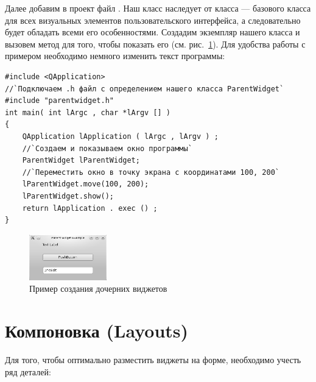 Далее добавим в проект файл . Наш класс наследует от 
класса  --- базового класса для всех
визуальных элементов пользовательского интерфейса, а следовательно будет 
обладать всеми его особенностями. Создадим
экземпляр нашего класса и вызовем метод  для того, чтобы показать 
его (см. рис.~\ref{ch13:refDrawing2}).
Для удобства работы с примером необходимо немного изменить текст программы: 
\begin{lstlisting}	 
#include <QApplication> 
//`Подключаем .h файл с определением нашего класса ParentWidget` 
#include "parentwidget.h" 
int main( int lArgc , char *lArgv [] ) 
{ 
    QApplication lApplication ( lArgc , lArgv ) ; 
    //`Создаем и показываем окно программы` 
    ParentWidget lParentWidget; 
    //`Переместить окно в точку экрана с координатами 100, 200` 
    lParentWidget.move(100, 200); 
    lParentWidget.show(); 
    return lApplication . exec () ; 
}
\end{lstlisting}


\begin{figure}[htb]
\begin{center}
\includegraphics[width=0.3\textwidth]{img/ris_13_3}
\caption[Пример создания дочерних виджетов]{Пример создания дочерних виджетов}
\label{ch13:refDrawing2}
\end{center}
\end{figure}

\section[Компоновка (Layouts)]{Компоновка (Layouts)}
Для того, чтобы оптимально разместить виджеты на форме, необходимо учесть ряд деталей:

